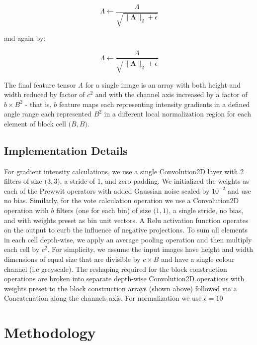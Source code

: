\documentclass{article}
\begin{document}
\[
\Lambda 
\leftarrow 
\frac{\Lambda}{\sqrt{\lVert \mathbf{\Lambda} \rVert_2 + \epsilon}}
\]

and again by:

\[
\Lambda 
\leftarrow 
\frac{\Lambda}{\sqrt{\lVert \mathbf{\Lambda} \rVert_2 + \epsilon}}
\]

The final feature tensor \(\Lambda\) for a single image is an array with both height and width reduced by factor of \(c^2\) and with the channel axis increased by a factor of \(b \times B^2\) - that is, \(b\) feature maps each representing intensity gradients in a defined angle range each represented \(B^2\) in a different local normalization region for each element of block cell \(\big(B, B \big)\). 

\subsection{\label{sec:level2}Implementation Details}

For gradient intensity calculations, we use a single Convolution2D layer with 2 filters of size \(\big(3, 3\big)\), a stride of 1, and zero padding. We initialized the weights as each of the Prewwit operators with added Gaussian noise scaled by \(10^{-2}\) and use no bias. Similarly, for the vote calculation operation we use a Convolution2D operation with \(b\) filters (one for each bin) of size \(\big(1, 1\big)\), a single stride, no bias, and with weights preset as bin unit vectors. A Relu activation function operates on the output to curb the influence of negative projections. To sum all elements in each cell depth-wise, we apply an average pooling operation and then multiply each cell by \(c^2\). For simplicity, we assume the input images have height and width dimensions of equal size that are divisible by \(c \times B\) and have a single colour channel (i.e greyscale). The reshaping required for the block construction operations are broken into separate depth-wise Convolution2D operations with weights preset to the block construction arrays (shown above) followed via a Concatenation along the channels axis. For normalization we use \(\epsilon = 10^{}\)


\section{Methodology} 
\end{document}
